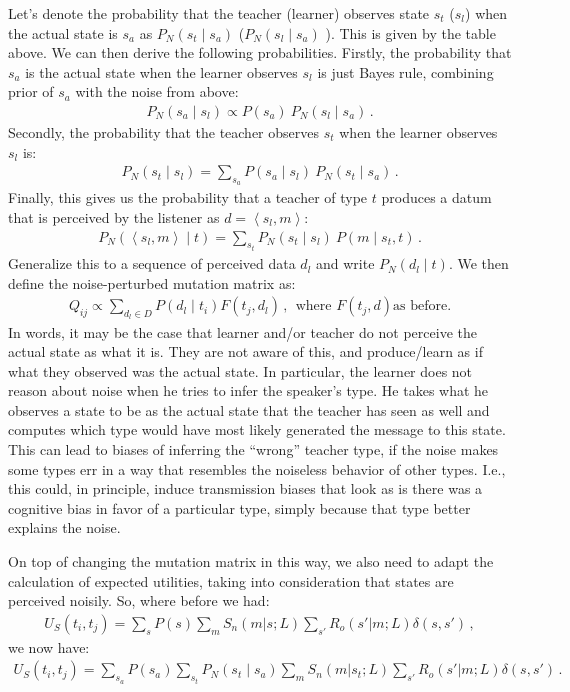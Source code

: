 \documentclass[a4paper]{article}
\newcommand{\tuple}[1]{\ensuremath{\left\langle #1 \right\rangle}}
\begin{document}
Let's denote the probability that the teacher (learner) observes state $s_t$ ($s_l$) when the
actual state is $s_a$ as $P_N(s_t \mid s_a)$ ($P_N(s_l \mid s_a)$ ). This is given by the table
above. We can then derive the following probabilities. Firstly, the probability that $s_a$ is
the actual state when the learner observes $s_l$ is just Bayes rule, combining prior of $s_a$
with the noise from above:
\begin{align*}
  P_N(s_a \mid s_l) \propto P(s_a) \ P_N(s_l \mid s_a)\,.
\end{align*}
Secondly, the probability that the teacher observes $s_t$ when the learner observes $s_l$ is:
\begin{align*}
  P_N(s_t \mid s_l) = \sum_{s_a} P(s_a \mid s_l) \ P_N(s_t \mid s_a)\,.
\end{align*}
Finally, this gives us the probability that a teacher of type $t$ produces a datum that is
perceived by the listener as $d = \tuple{s_l, m}$:
\begin{align*}
  P_N(\tuple{s_l, m} \mid t) = \sum_{s_t} P_N(s_t \mid s_l) \ P(m \mid s_t, t)\,.
\end{align*}
Generalize this to a sequence of perceived data $d_l$ and write $P_N(d_l \mid t)$. We then
define the noise-perturbed mutation matrix as:
\begin{align*}
  Q_{ij}  \propto \sum_{d_l \in D} P(d_l \mid t_i) F(t_j,d_l) \,, \ \  \text{where $F(t_j,d)$
    as before.}
\end{align*}
In words, it may be the case that learner and/or teacher do not perceive the actual state as
what it is. They are not aware of this, and produce/learn as if what they observed was the
actual state. In particular, the learner does not reason about noise when he tries to infer the
speaker's type. He takes what he observes a state to be as the actual state that the teacher
has seen as well and computes which type would have most likely generated the message to this
state. This can lead to biases of inferring the ``wrong'' teacher type, if the noise makes some
types err in a way that resembles the noiseless behavior of other types. I.e., this could, in
principle, induce transmission biases that look as is there was a cognitive bias in favor of a
particular type, simply because that type better explains the noise.

On top of changing the mutation matrix in this way, we also need to adapt the calculation of
expected utilities, taking into consideration that states are perceived noisily. So, where
before we had:
\begin{align*}
  U_S(t_i,t_j) = \sum_s P(s)\sum_m S_n(m|s;L) \sum_{s'} R_o(s'|m;L) \delta(s,s')\,,
\end{align*}
we now have:
\begin{align*}
  U_S(t_i,t_j) = \sum_{s_a}  P(s_a) \sum_{s_t} P_N(s_t \mid s_a) \sum_m S_n(m|s_t;L) \sum_{s'} R_o(s'|m;L) \delta(s,s')\,.
\end{align*}
\end{document}
